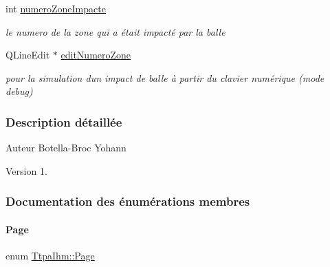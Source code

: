 \begin{DoxyCompactItemize}
int \hyperlink{class_ttpa_ihm_af8fa0aee928ee727f27ff605c0c1d991}{numero\+Zone\+Impacte}
\begin{DoxyCompactList}\small\item\em le numero de la zone qui a était impacté par la balle \end{DoxyCompactList}\item 
Q\+Line\+Edit $\ast$ \hyperlink{class_ttpa_ihm_a843f5742ec2289d08e2be94dda2c9128}{edit\+Numero\+Zone}
\begin{DoxyCompactList}\small\item\em pour la simulation d\textquotesingle{}un impact de balle à partir du clavier numérique (mode debug) \end{DoxyCompactList}\end{DoxyCompactItemize}


\subsubsection{Description détaillée}
\begin{DoxyAuthor}{Auteur}
Botella-\/\+Broc Yohann
\end{DoxyAuthor}
\begin{DoxyVersion}{Version}
1. 
\end{DoxyVersion}


\subsubsection{Documentation des énumérations membres}
\mbox{\label{class_ttpa_ihm_aad886f2c7b90b4f990492092f0be9c2b}} 
\paragraph{\texorpdfstring{Page}{Page}}
{\footnotesize\ttfamily enum \hyperlink{class_ttpa_ihm_aad886f2c7b90b4f990492092f0be9c2b}{Ttpa\+Ihm\+::\+Page}\hspace{0.3cm}{\ttfamily [private]}}

